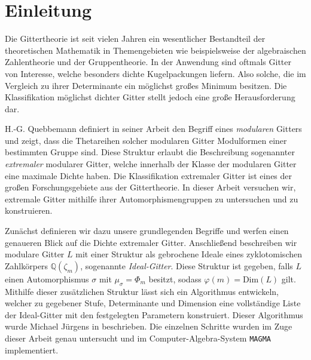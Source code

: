 \documentclass[12pt,a4paper,halfparskip,headsepline,bibtotocnumbered]{scrreprt}
\theoremstyle{nummermitklammern}
\theoremstyle{nonumberbreak}
\newcommand{\Q}{\mathbb{Q}}
\begin{document}
\chapter{Einleitung}
Die Gittertheorie ist seit vielen Jahren ein wesentlicher Bestandteil der theoretischen Mathematik in Themengebieten wie beispielsweise der algebraischen Zahlentheorie und der Gruppentheorie. In der Anwendung sind oftmals Gitter von Interesse, welche besonders dichte Kugelpackungen liefern. Also solche, die im Vergleich zu ihrer Determinante ein möglichst großes Minimum besitzen. Die Klassifikation möglichst dichter Gitter stellt jedoch eine große Herausforderung dar.\par
H.-G. Quebbemann definiert in seiner Arbeit \cite{quebbemann} den Begriff eines \textit{modularen} Gitters und zeigt, dass die Thetareihen solcher modularen Gitter Modulformen einer bestimmten Gruppe sind. Diese Struktur erlaubt die Beschreibung sogenannter \textit{extremaler} modularer Gitter, welche innerhalb der Klasse der modularen Gitter eine maximale Dichte haben. Die Klassifikation extremaler Gitter ist eines der großen Forschungsgebiete aus der Gittertheorie. In dieser Arbeit versuchen wir, extremale Gitter mithilfe ihrer Automorphismengruppen zu untersuchen und zu konstruieren.\par
Zunächst definieren wir dazu unsere grundlegenden Begriffe und werfen einen genaueren Blick auf die Dichte extremaler Gitter. Anschließend beschreiben wir modulare Gitter $L$ mit einer Struktur als gebrochene Ideale eines zyklotomischen Zahlkörpers $\Q(\zeta_m)$, sogenannte \textit{Ideal-Gitter}. Diese Struktur ist gegeben, falls $L$ einen Automorphismus $\sigma$ mit $\mu_\sigma = \Phi_m$ besitzt, sodass $\varphi(m) = \text{Dim}(L)$ gilt. Mithilfe dieser zusätzlichen Struktur lässt sich ein Algorithmus entwickeln, welcher zu gegebener Stufe, Determinante und Dimension eine vollständige Liste der Ideal-Gitter mit den festgelegten Parametern konstruiert. Dieser Algorithmus wurde Michael Jürgens in \cite{juergens} beschrieben. Die einzelnen Schritte wurden im Zuge dieser Arbeit genau untersucht und im Computer-Algebra-System \texttt{MAGMA} implementiert.\par
\end{document}
